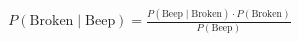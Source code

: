 \documentclass[preview]{standalone}
\begin{document}
\begin{align*}
P(\text{Broken} \mid \text{Beep}) = \frac{P(\text{Beep} \mid \text{Broken}) \cdot P(\text{Broken})}{P(\text{Beep})}
\end{align*}
\end{document}

